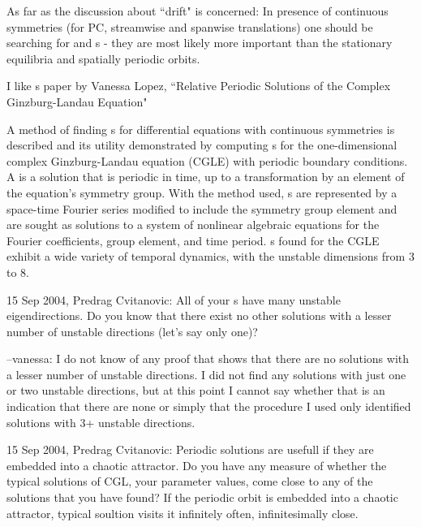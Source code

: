 As far as the discussion about ``drift" is concerned:
In presence of continuous symmetries (for PC, streamwise and
spanwise translations) one should be searching for 
{\reqva} and 
{\rpo s} - they are most likely more important than
the stationary equilibria and spatially periodic orbits. 

I like {\rpo s} paper by
Vanessa Lopez,
``Relative Periodic Solutions of the Complex Ginzburg-Landau Equation" 
     
     
A method of finding {\rpo s} for differential equations with 
continuous symmetries is described and its utility demonstrated by computing 
{\rpo s} for the one-dimensional complex Ginzburg-Landau 
equation (CGLE) with periodic boundary conditions.  A {\rpo} is 
a solution that is periodic in time, up to a transformation by an element of the 
equation's symmetry group.  With the method used, {\rpo s} are 
represented by a space-time Fourier series modified to include the symmetry 
group element and are sought as solutions to a system of nonlinear algebraic 
equations for the Fourier coefficients, group element, and time period. 
{\Rpo s} found for the CGLE exhibit a wide variety of temporal 
dynamics,
with the %
unstable dimensions from 3 to 8.

15 Sep 2004, Predrag Cvitanovic:
All of your {\Rpo s} have many unstable
eigendirections. Do you know that there exist no other solutions with a
lesser number of unstable directions (let's say only one)?

--vanessa:
I do not know of any proof that shows that there are no solutions with a
lesser number of unstable directions.  I did not find any solutions with
just one or two unstable directions, but at this point I cannot say
whether that is an indication that there are none or simply that
the procedure I used only identified solutions with 3+ unstable
directions.

15 Sep 2004, Predrag Cvitanovic:
Periodic solutions are usefull if they are embedded into a chaotic
attractor. Do you have any measure of whether the typical solutions of
CGL, your parameter values, come close to any of the solutions that you
have found? If the periodic orbit is embedded into a chaotic attractor,
typical soultion visits it infinitely often, infinitesimally close.

